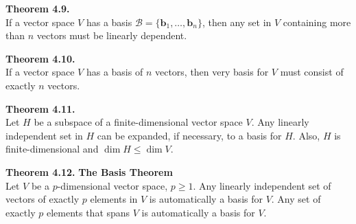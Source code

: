 \documentclass[10pt]{book}
\newenvironment{boxthm}{\begin{mdframed}[backgroundcolor=gray!30,nobreak=true]}{\end{mdframed}}
\newcommand{\B}{\mathscr{B}}
\newcommand{\vect}[1]{\ensuremath{\boldsymbol{\mathbf{#1}}}}
\newcommand{\vectset}[3][v]{\{\vect{#1}_{#2},\ldots,\vect{#1}_{#3}\}}
\begin{document}
\begin{boxthm}
	\textbf{Theorem 4.9.} \\
	If a vector space $V$ has a basis $\B=\vectset[b]{1}{n}$, then any set in $V$ containing more than $n$ vectors must be linearly dependent.
\end{boxthm}
\begin{boxthm}
	\textbf{Theorem 4.10.} \\
	If a vector space $V$ has a basis of $n$ vectors, then very basis for $V$ must consist of exactly $n$ vectors.
\end{boxthm}
\begin{boxthm}
	\textbf{Theorem 4.11.} \\
	Let $H$ be a subspace of a finite-dimensional vector space $V$. Any linearly independent set in $H$ can be expanded, if necessary, to a basis for $H$. Also, $H$ is finite-dimensional and $\dim H\leq\dim V$.
\end{boxthm}
\begin{boxthm}
	\textbf{Theorem 4.12.}
	\textbf{The Basis Theorem} \\
	Let $V$ be a $p$-dimensional vector space, $p\geq 1$. Any linearly independent set of vectors of exactly $p$ elements in $V$ is automatically a basis for $V$. Any set of exactly $p$ elements that spans $V$ is automatically a basis for $V$.
\end{boxthm}


\newpage


\end{document}
